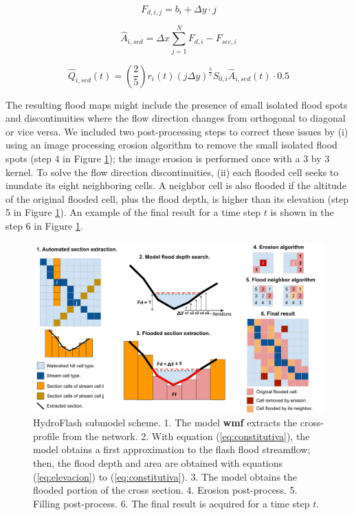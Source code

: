 \documentclass[hess, manuscript]{copernicus}
\begin{document}
 \begin{equation}
     F_{d,i,j} = b_i + \Delta y \cdot j
     \label{eq:elevacion}
 \end{equation}
 
 \begin{equation}
  \hat{A}_{i,sed} = \Delta x \sum_{j=1}^{N} F_{d,i} - F_{sec,i} 
  \label{eq:differencia}
 \end{equation}
 
 \begin{equation}
   \hat{Q}_{i,sed}(t) = \left( \frac{2}{5} \right) r_i(t)(j \Delta y)^{\frac{3}{2}} S_{0,i} \hat{A}_{i,sed}(t) \cdot 0.5
 \label{eq:constitutiva} 
 \end{equation}

The resulting flood maps might include the presence of small isolated flood spots and discontinuities where the flow direction changes from orthogonal to diagonal or vice versa. We included two post-processing steps to correct these issues by (i) using an image processing erosion algorithm \citep{Serra1983} to remove the small isolated flood spots (step 4 in Figure \ref{fig:hydroflash}); the image erosion is performed once with a 3 by 3 kernel. To solve the flow direction discontinuities, (ii) each flooded cell seeks to inundate its eight neighboring cells. A neighbor cell is also flooded if the altitude of the original flooded cell, plus the flood depth, is higher than its elevation (step 5 in Figure \ref{fig:hydroflash}). An example of the final result for a time step $t$ is shown in the step 6 in Figure \ref{fig:hydroflash}.

\begin{figure}[t]
\centering
 \includegraphics[width=12cm]{Figures/HydroFlash_scheme.png}
 \caption{HydroFlash submodel scheme. 1. The model \textbf{wmf} extracts the cross-profile from the network. 2. With equation (\ref{eq:constitutiva}), the model obtains a first approximation to the flash flood streamflow; then, the flood depth and area are obtained with equations (\ref{eq:elevacion}) to (\ref{eq:constitutiva}). 3. The model obtains the flooded portion of the cross section. 4. Erosion post-process. 5. Filling post-process. 6. The final result is acquired for a time step $t$.}
    \label{fig:hydroflash}
\end{figure}
\end{document}

